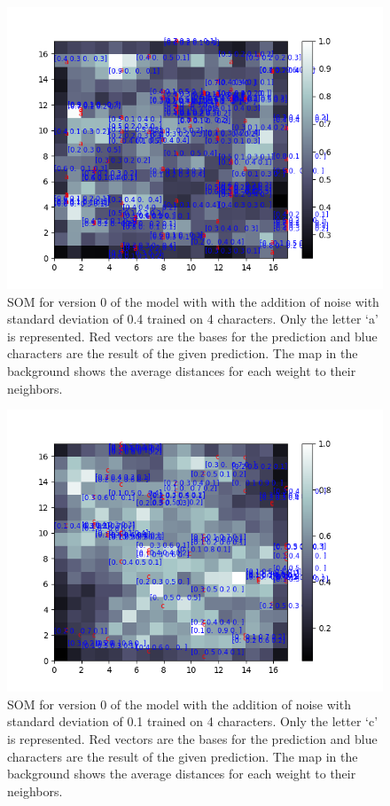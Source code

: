 \begin{figure}[!htb]
	\centering
	\includegraphics[width=\textwidth]{images/SOM_graphics/17x17_4d_noise_04_v0/a.png}
	\caption{SOM for version 0 of the model with with the addition of noise with standard deviation of 0.4 trained on 4 characters. Only the letter `a' is represented. Red vectors are the bases for the prediction and blue characters are the result of the given prediction. The map in the background shows the average distances for each weight to their neighbors.}
	\label{fig:4d_noise_04_a}
\end{figure}


\begin{figure}[!htb]
	\centering
	\includegraphics[width=\textwidth]{images/SOM_graphics/17x17_4d_noise_01_v0/c.png}
	\caption{SOM for version 0 of the model with the addition of noise with standard deviation of 0.1 trained on 4 characters. Only the letter `c' is represented. Red vectors are the bases for the prediction and blue characters are the result of the given prediction. The map in the background shows the average distances for each weight to their neighbors.}
	\label{fig:4d_noise_01_c}
\end{figure}



